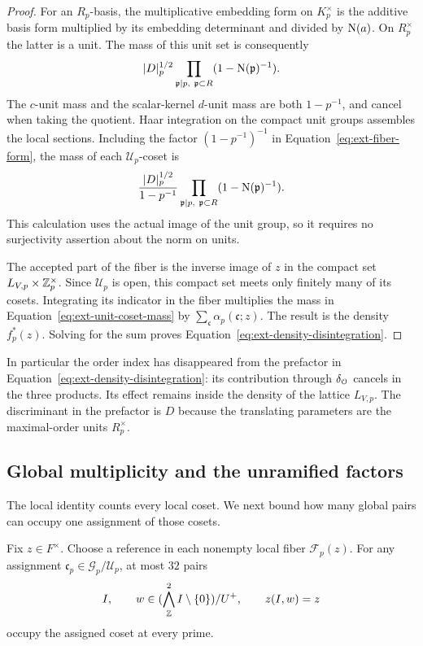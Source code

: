\begin{proof}
For an \(R_p\)-basis, the multiplicative embedding form on \(K_p^\times\)
is the additive basis form multiplied by its embedding determinant
and divided by \(\operatorname{N}(a)\).  On \(R_p^\times\) the latter is a unit.
The mass of this unit set is consequently
\[
 |D|_p^{1/2}
 \prod_{\mathfrak p\mid p,\ \mathfrak p\subset R}
               (1-\operatorname{N}(\mathfrak p)^{-1}).
\]
The \(c\)-unit mass and the scalar-kernel \(d\)-unit mass are both
\(1-p^{-1}\), and cancel when taking the quotient.  Haar integration
on the compact unit groups assembles the local sections.  Including the
factor \((1-p^{-1})^{-1}\) in Equation~\eqref{eq:ext-fiber-form}, the
mass of each \(\mathscr U_p\)-coset is
\begin{equation}
 \frac{|D|_p^{1/2}}{1-p^{-1}}
 \prod_{\mathfrak p\mid p,\ \mathfrak p\subset R}
               (1-\operatorname{N}(\mathfrak p)^{-1}).
 \label{eq:ext-unit-coset-mass}
\end{equation}
This calculation uses the actual image of the unit group, so it
requires no surjectivity assertion about the norm on units.

The accepted part of the fiber is the inverse image of \(z\) in the
compact set \(L_{V,p}\times\mathbb Z_p^\times\).  Since \(\mathscr U_p\) is
open, this compact set meets only finitely many of its cosets.
Integrating its indicator in the fiber multiplies the mass in
Equation~\eqref{eq:ext-unit-coset-mass} by
\(\sum_{\mathfrak c}\alpha_p(\mathfrak c;z)\).  The result is the
density \(f_p^*(z)\).  Solving for the sum proves
Equation~\eqref{eq:ext-density-disintegration}.
\end{proof}

In particular the order index has disappeared from the prefactor in
Equation~\eqref{eq:ext-density-disintegration}: its contribution through
\(\delta_{\mathcal O}\) cancels in the three products.  Its effect remains
inside the density of the lattice \(L_{V,p}\).  The discriminant in the
prefactor is \(D\) because the translating parameters are the
maximal-order units \(R_p^\times\).

\subsection{Global multiplicity and the unramified factors}

The local identity counts every local coset.  We next bound how many
global pairs can occupy one assignment of those cosets.

\begin{lemma}
\label{lem:ext-global-cosets}
Fix \(z\in F^\times\).  Choose a reference in each nonempty local fiber
\(\mathscr F_p(z)\).  For any assignment
\(\mathfrak c_p\in\mathscr G_p/\mathscr U_p\), at most \(32\) pairs
\[
 I,\qquad w\in(\bigwedge^2_{\mathbb Z}I\setminus\{0\})/U^+,\qquad z(I,w)=z
\]
occupy the assigned coset at every prime.
\end{lemma}

